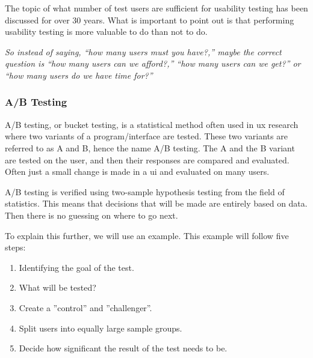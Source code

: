 The topic of what number of test users are sufficient for usability testing has been discussed for over 30 years. What is important to point out is that performing usability testing is more valuable to do than not to do. 


\textit{
So instead of saying, “how many users must you have?,” maybe the correct question is “how many users can we afford?,” “how many users can we get?” or “how many users do we have time for?”
} \cite{lazar2017research} 








\subsubsection{A/B Testing}%
\label{sub:A/B Testing}
 

A/B testing, or bucket testing, is a statistical method often used in \acrfull{ux} research where two variants of a program/interface are tested. These two variants are referred to as A and B, hence the name A/B testing. The A and the B variant are tested on the user, and then their responses are compared and evaluated. Often just a small change is made in a \acrshort{ui} and evaluated on many users. 

A/B testing is verified using two-sample hypothesis testing from the field of statistics. This means that decisions that will be made are entirely based on data. Then there is no guessing on where to go next.

To explain this further, we will use an example.
This example will follow five steps: 
\begin{enumerate}
  \item Identifying the goal of the test. 
  \item What will be tested? 
 \item Create a ''control'' and ''challenger''. 
 \item Split users into equally large sample groups.
 \item Decide how significant the result of the test needs to be.
\end{enumerate}
 
